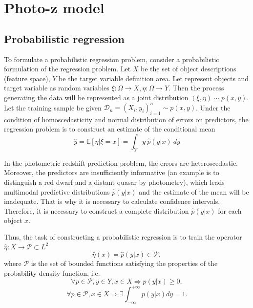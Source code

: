 \documentclass[fleqn,usenatbib]{mnras}
\begin{document}
\section{Photo-z model}\label{sec:thealgorithm}

\subsection{Probabilistic regression}
To formulate a probabilistic regression problem, consider a probabilistic formulation of the regression problem. Let \(X\) be the set of object descriptions (feature space), \(Y\) be the target variable definition area. Let represent objects and target variable as random variables \(\xi : \Omega \rightarrow X, \eta : \Omega \rightarrow Y \). Then the process generating the data will be represented as a joint distribution \((\xi, \eta) \sim p(x, y)\). Let the training sample be given \(\mathcal{D}_n = (X_i, y_i)_{i=1}^n \sim p(x,y)\). Under the condition of homoscedasticity and normal distribution of errors on predictors, the regression problem is to construct an estimate of the conditional mean
\begin{equation}\label{eq:regr_classic}
     \hat{y} = \mathbb{E}[\eta | \xi = x] = \int_Y y ~ \hat{p}(y|x) ~ dy
\end{equation}

In the photometric redshift prediction problem, the errors are heteroscedastic. Moreover, the predictors are insufficiently informative (an example is to distinguish a red dwarf and a distant quasar by photometry), which leads multimodal predictive distributions $\hat{p}(y|x)$ and the estimate of the mean will be inadequate. That is why it is necessary to calculate confidence intervals. Therefore, it is necessary to construct a complete distribution $\hat{p}(y|x)$ for each object $x$.

Thus, the task of constructing a probabilistic regression is to train the operator \(\hat{\eta} : X \rightarrow \mathcal{P} \subset L^2\)
\begin{equation}
    \hat{\eta}(x) = \hat{p}(y|x) \in \mathcal{P},
\end{equation}
where \(\mathcal{P}\) is the set of bounded functions satisfying the properties of the probability density function, i.e.
\begin{equation}
    \forall p \in \mathcal{P}, y \in Y, x \in X \Rightarrow p(y|x) \geq 0,
\end{equation}
\begin{equation}
    \forall p \in \mathcal{P}, x \in X \Rightarrow \exists \int_{-\infty}^{+\infty} p(y|x) dy = 1.
\end{equation}
\end{document}
